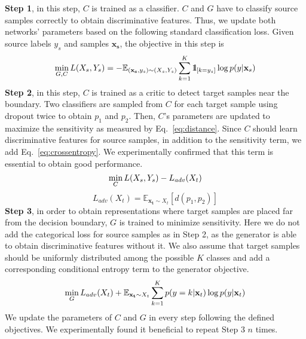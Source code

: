 \documentclass{article} \usepackage{iclr2018_conference,times}
\begin{document}
{\bf Step 1}, in this step, $C$ is trained as a classifier. $C$ and $G$ have to classify source samples correctly to obtain discriminative features. Thus, we update both networks' parameters based on the following standard classification loss. 
Given source labels $y_{s}$ and samples $\mathbf{x_{s}}$, the objective in this step is
\newcommand{\mymin}{\mathop{\rm min}\limits}
\newcommand{\mymax}{\mathop{\rm max}\limits}
\newcommand{\1}{\mbox{1}\hspace{-0.25em}\mbox{l}}
\begin{equation}
   \mymin_{G,C} L(X_{s},Y_{s}) = -{\mathbb{E}_{(\mathbf{x_{s}},y_{s})\sim(X_{s},Y_{s})}}\sum_{k=1}^{K}{\1_{[k=y_{s}]}}\log p(y|{\mathbf x_{s}})\label{eq:crossentropy}
  \end{equation}
{\bf Step 2}, in this step, $C$ is trained as a critic to detect target samples near the boundary. Two classifiers are sampled from $C$ for each target sample using dropout twice to obtain $p_1$ and $p_2$. Then, $C$'s parameters are updated to maximize the sensitivity as measured by Eq.~\ref{eq:distance}. Since $C$ should learn discriminative features for source samples, in addition to the sensitivity term, we add  Eq.~\ref{eq:crossentropy}. We experimentally confirmed that this term is essential to obtain good performance.
\begin{equation}
  \mymin_{C} L(X_{s},Y_{s}) - L_{adv}(X_{t}) \\
\end{equation}
\begin{equation}
  L_{adv}(X_{t}) = {\mathbb{E}_{\mathbf{x_{t}}\sim X_{t}}}[d(p_1,p_2)]
  \label{eq:sensitivity}
  \end{equation}
{\bf Step 3}, in order to obtain representations where target samples are placed far from the decision boundary, $G$ is trained to minimize sensitivity. Here we do not add the categorical loss for source samples as in Step 2, as the generator is able to obtain discriminative features without it. We also assume that target samples should be uniformly distributed among the possible $K$ classes and add a corresponding conditional entropy term to the generator objective. 
\begin{equation}
  \mymin_{G} L_{adv}(X_{t}) + {\mathbb{E}_{\mathbf{x_{t}}\sim X_{t}}}\sum_{k=1}^{K}p(y=k|{\mathbf x_{t}}) \log p(y|{\mathbf x_{t}})\\
  \end{equation}
We update the parameters of $C$ and $G$ in every step following the defined objectives. We experimentally found it beneficial to repeat Step 3 $n$ times.
\end{document}
